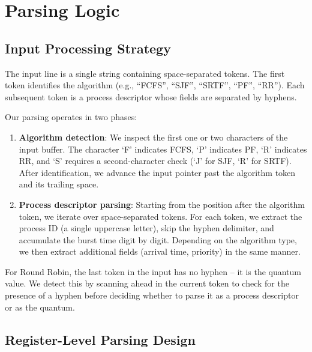 \documentclass[a4paper,12pt]{article}
\begin{document}
\section{Parsing Logic}

\subsection{Input Processing Strategy}

The input line is a single string containing space-separated tokens. The first token identifies the algorithm (e.g., ``FCFS'', ``SJF'', ``SRTF'', ``PF'', ``RR''). Each subsequent token is a process descriptor whose fields are separated by hyphens.

Our parsing operates in two phases:
\begin{enumerate}
    \item \textbf{Algorithm detection}: We inspect the first one or two characters of the input buffer. The character `F' indicates FCFS, `P' indicates PF, `R' indicates RR, and `S' requires a second-character check (`J' for SJF, `R' for SRTF). After identification, we advance the input pointer past the algorithm token and its trailing space.
    \item \textbf{Process descriptor parsing}: Starting from the position after the algorithm token, we iterate over space-separated tokens. For each token, we extract the process ID (a single uppercase letter), skip the hyphen delimiter, and accumulate the burst time digit by digit. Depending on the algorithm type, we then extract additional fields (arrival time, priority) in the same manner.
\end{enumerate}

For Round Robin, the last token in the input has no hyphen -- it is the quantum value. We detect this by scanning ahead in the current token to check for the presence of a hyphen before deciding whether to parse it as a process descriptor or as the quantum.

\subsection{Register-Level Parsing Design}
\end{document}
